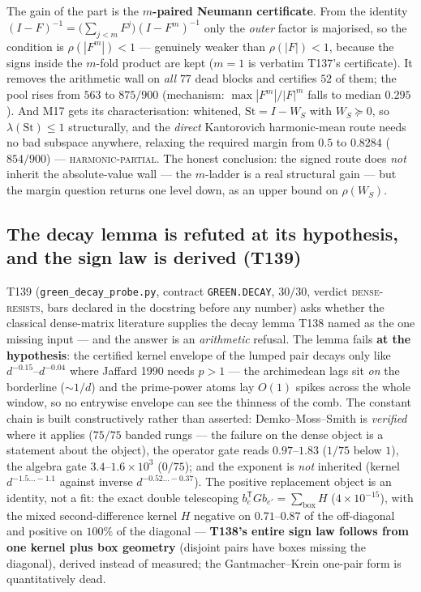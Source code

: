 \documentclass[11pt,a4paper]{article}
\begin{document}
The gain of the part is the \textbf{$m$-paired Neumann certificate}. From the identity
$(I-F)^{-1}=\bigl(\sum_{j<m}F^{j}\bigr)(I-F^{m})^{-1}$ only the \emph{outer} factor is majorised, so
the condition is $\rho(|F^{m}|)<1$ --- genuinely weaker than $\rho(|F|)<1$, because the signs inside
the $m$-fold product are kept ($m=1$ is verbatim T137's certificate). It removes the arithmetic wall
on \emph{all} $77$ dead blocks and certifies $52$ of them; the pool rises from $563$ to $875/900$
(mechanism: $\max|F^{m}|/|F|^{m}$ falls to median $0.295$). And M17 gets its characterisation:
whitened, $\mathrm{St}=I-W_S$ with $W_S\succeq0$, so $\lambda(\mathrm{St})\le1$ structurally, and the
\emph{direct} Kantorovich harmonic-mean route needs no bad subspace anywhere, relaxing the required
margin from $0.5$ to $0.8284$ ($854/900$) --- \textsc{harmonic-partial}. The honest conclusion: the
signed route does \emph{not} inherit the absolute-value wall --- the $m$-ladder is a real structural
gain --- but the margin question returns one level down, as an upper bound on $\rho(W_S)$.

\subsection{The decay lemma is refuted at its hypothesis, and the sign law is derived (T139)}
T139 (\texttt{green\_decay\_probe.py}, contract \texttt{GREEN.DECAY}, $30/30$, verdict
\textsc{dense-resists}, bars declared in the docstring before any number) asks whether the classical
dense-matrix literature supplies the decay lemma T138 named as the one missing input --- and the
answer is an \emph{arithmetic} refusal. The lemma fails \textbf{at the hypothesis}: the certified
kernel envelope of the lumped pair decays only like $d^{-0.15}$--$d^{-0.04}$ where Jaffard 1990 needs
$p>1$ --- the archimedean lags sit \emph{on} the borderline ($\sim1/d$) and the prime-power atoms lay
$O(1)$ spikes across the whole window, so no entrywise envelope can see the thinness of the comb. The
constant chain is built constructively rather than asserted: Demko--Moss--Smith is \emph{verified}
where it applies ($75/75$ banded rungs --- the failure on the dense object is a statement about the
object), the operator gate reads $0.97$--$1.83$ ($1/75$ below $1$), the algebra gate
$3.4$--$1.6\times10^{3}$ ($0/75$); and the exponent is \emph{not} inherited (kernel
$d^{-1.5\ldots-1.1}$ against inverse $d^{-0.52\ldots-0.37}$). The positive replacement object is an
identity, not a fit: the exact double telescoping
$b_e^{\mathsf T}Gb_{e'}=\sum_{\mathrm{box}}H$ ($4\times10^{-15}$), with the mixed second-difference
kernel $H$ negative on $0.71$--$0.87$ of the off-diagonal and positive on $100\%$ of the diagonal ---
\textbf{T138's entire sign law follows from one kernel plus box geometry} (disjoint pairs have boxes
missing the diagonal), derived instead of measured; the Gantmacher--Krein one-pair form is
quantitatively dead.
\end{document}
